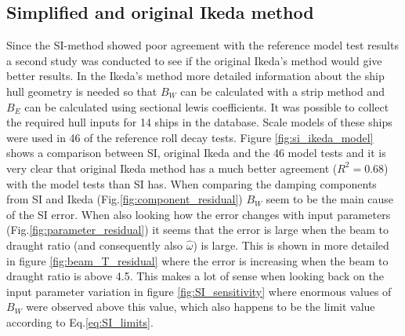 \subsection{Simplified and original Ikeda method}
\label{se:si_ikeda_model}
Since the SI-method showed poor agreement with the reference model test results a second study was conducted to see if the original Ikeda's method would give better results. In the Ikeda's method more detailed information about the ship hull geometry is needed so that $B_W$ can be calculated with a strip method and $B_E$ can be calculated using sectional lewis coefficients. It was possible to collect the required hull inputs for 14 ships in the database. Scale models of these ships were used in 46 of the reference roll decay tests.
Figure \ref{fig:si_ikeda_model} shows a comparison between SI, original Ikeda and the 46 model tests and it is very clear that original Ikeda method has a much better agreement ($R^2=0.68$) with the model tests than SI has. When comparing the damping components from SI and Ikeda (Fig.\ref{fig:component_residual}) $B_W$ seem to be the main cause of the SI error. When also looking how the error changes with input parameters (Fig.\ref{fig:parameter_residual}) it seems that the error is large when the beam to draught ratio (and consequently also $\hat{\omega}$) is large. This is shown in more detailed in figure \ref{fig:beam_T_residual} where the error is increasing when the beam to draught ratio is above 4.5. This makes a lot of sense when looking back on the input parameter variation in figure \ref{fig:SI_sensitivity} where enormous values of $B_W$ were observed above this value, which also happens to be the limit value according to Eq.\ref{eq:SI_limits}.


